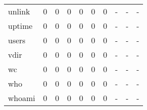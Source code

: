 \begin{longtable}{lp{1.3cm}p{1.3cm}p{1.3cm}p{1.3cm}p{1.3cm}p{1.3cm}p{1.3cm}p{1.3cm}p{1.3cm}}
unlink    &                      0 &                                             0 &                                            0 &                                           0 &                                            0 &                                          0 &                                    - &                                      - &                                    - \\
uptime    &                      0 &                                             0 &                                            0 &                                           0 &                                            0 &                                          0 &                                    - &                                      - &                                    - \\
users     &                      0 &                                             0 &                                            0 &                                           0 &                                            0 &                                          0 &                                    - &                                      - &                                    - \\
vdir      &                      0 &                                             0 &                                            0 &                                           0 &                                            0 &                                          0 &                                    - &                                      - &                                    - \\
wc        &                      0 &                                             0 &                                            0 &                                           0 &                                            0 &                                          0 &                                    - &                                      - &                                    - \\
who       &                      0 &                                             0 &                                            0 &                                           0 &                                            0 &                                          0 &                                    - &                                      - &                                    - \\
whoami    &                      0 &                                             0 &                                            0 &                                           0 &                                            0 &                                          0 &                                    - &                                      - &                                    - \\

\end{longtable}
